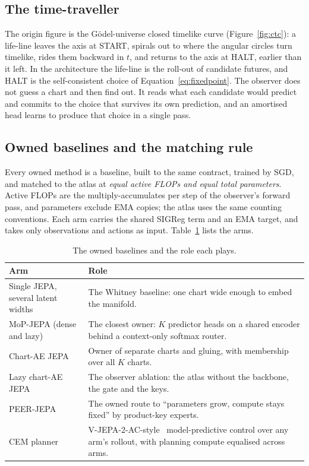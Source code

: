 \subsection{The time-traveller}

The origin figure is the G\"odel-universe closed timelike curve (Figure~\ref{fig:ctc}): a life-line leaves the axis at START, spirals out to where the angular circles turn timelike, rides them backward in $t$, and returns to the axis at HALT, earlier than it left. In the architecture the life-line is the roll-out of candidate futures, and HALT is the self-consistent choice of Equation~\eqref{eq:fixedpoint}. The observer does not guess a chart and then find out. It reads what each candidate would predict and commits to the choice that survives its own prediction, and an amortised head learns to produce that choice in a single pass.

\begin{figure}[t]
  \centering
  
\end{figure}

\subsection{Owned baselines and the matching rule}\label{sec:baselines}

Every owned method is a baseline, built to the same contract, trained by SGD, and matched to the atlas at \emph{equal active FLOPs and equal total parameters}. Active FLOPs are the multiply-accumulates per step of the observer's forward pass, and parameters exclude EMA copies; the atlas uses the same counting conventions. Each arm carries the shared SIGReg term and an EMA target, and takes only observations and actions as input. Table~\ref{tab:arms} lists the arms.

\begin{table}[t]
\centering
\small
\caption{The owned baselines and the role each plays.}
\label{tab:arms}
\begin{tabular}{@{}p{4.2cm}p{11.2cm}@{}}
\toprule
Arm & Role \\
\midrule
Single JEPA, several latent widths & The Whitney baseline: one chart wide enough to embed the manifold. \\
MoP-JEPA (dense and lazy)~\cite{mopjepa} & The closest owner: $K$ predictor heads on a shared encoder behind a context-only softmax router. \\
Chart-AE JEPA~\cite{schonsheck2019chartae} & Owner of separate charts and gluing, with membership over all $K$ charts. \\
Lazy chart-AE JEPA & The observer ablation: the atlas without the backbone, the gate and the keys. \\
PEER-JEPA~\cite{peer} & The owned route to ``parameters grow, compute stays fixed'' by product-key experts. \\
CEM planner & V-JEPA-2-AC-style~\cite{vjepa2} model-predictive control over any arm's rollout, with planning compute equalised across arms. \\
\bottomrule
\end{tabular}
\end{table}

